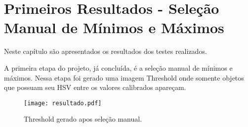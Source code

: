 
\chapter{Primeiros Resultados - Seleção Manual de Mínimos e Máximos}
 \label{Cap:Resultados}

Neste capítulo são apresentados os resultados dos testes realizados. 

A primeira etapa do projeto, já concluída, é a seleção manual de mínimos e máximos. Nessa etapa foi gerado uma imagem Threshold onde somente objetos que possuam seu HSV entre os valores calibrados apareçam. 
\begin{figure}[h]
	\centering
	\texttt{[image: resultado.pdf]}
	\caption{Threshold gerado apos seleção manual.}
	\label{ResultadoManual}
\end{figure} 

